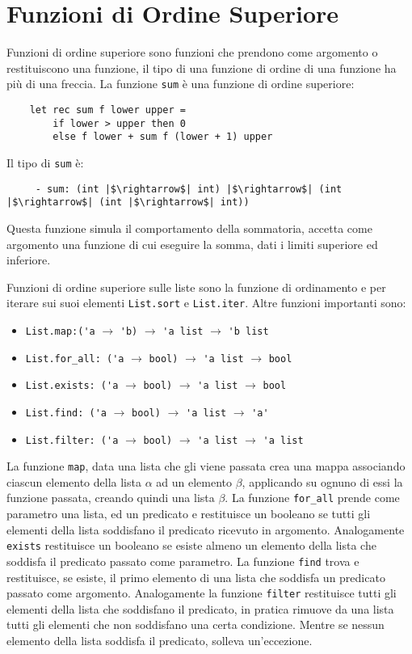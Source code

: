 \documentclass{article}
\numberwithin{equation}{subsection}
\begin{document}
\clearpage

\section{Funzioni di Ordine Superiore}

Funzioni di ordine superiore sono funzioni che prendono come argomento o restituiscono una funzione, il tipo di una funzione di ordine di una funzione ha più di una freccia. La funzione \verb|sum| è una funzione di ordine superiore:
\begin{verbatim}
    let rec sum f lower upper =
        if lower > upper then 0
        else f lower + sum f (lower + 1) upper
\end{verbatim}
Il tipo di \verb|sum| è:
\begin{verbatim}
     - sum: (int |$\rightarrow$| int) |$\rightarrow$| (int |$\rightarrow$| (int |$\rightarrow$| int)) 
\end{verbatim}
Questa funzione simula il comportamento della sommatoria, accetta come argomento una funzione di cui eseguire la somma, dati i limiti superiore ed inferiore. 

Funzioni di ordine superiore sulle liste sono la funzione di ordinamento e per iterare sui suoi elementi \verb|List.sort| e \verb|List.iter|. 
Altre funzioni importanti sono:
\begin{itemize}
    \item \verb|List.map:('a| $\rightarrow$ \verb|'b)| $\rightarrow$ \verb|'a list| $\rightarrow$ \verb|'b list|
    \item \verb|List.for_all: ('a| $\rightarrow$ \verb|bool)| $\rightarrow$ \verb|'a list| $\rightarrow$ \verb|bool|
    \item \verb|List.exists: ('a| $\rightarrow$ \verb|bool)| $\rightarrow$ \verb|'a list| $\rightarrow$ \verb|bool|
    \item \verb|List.find: ('a| $\rightarrow$ \verb|bool)| $\rightarrow$ \verb|'a list| $\rightarrow$ \verb|'a'|
    \item \verb|List.filter: ('a| $\rightarrow$ \verb|bool)| $\rightarrow$ \verb|'a list| $\rightarrow$ \verb|'a list|
\end{itemize}

La funzione \verb|map|, data una lista che gli viene passata crea una mappa associando ciascun elemento della lista $\alpha$ ad un elemento $\beta$, applicando su ognuno di essi la funzione passata, creando quindi una lista $\beta$. 
La funzione \verb|for_all| prende come parametro una lista, ed un predicato e restituisce un booleano se tutti gli elementi della lista soddisfano il predicato ricevuto in argomento. 
Analogamente \verb|exists| restituisce un booleano se esiste almeno un elemento della lista che soddisfa il predicato passato come parametro. 
La funzione \verb|find| trova e restituisce, se esiste, il primo elemento di una lista che soddisfa un predicato passato come argomento. 
Analogamente la funzione \verb|filter| restituisce tutti gli elementi della lista che soddisfano il predicato, in pratica rimuove da una lista tutti gli elementi che non soddisfano una certa condizione. Mentre se nessun elemento della lista soddisfa il predicato, solleva un'eccezione. 
\end{document}
